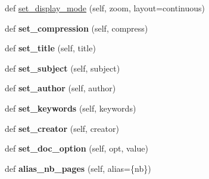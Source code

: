\begin{DoxyCompactItemize}
\item 
def \hyperlink{class_libraries_1_1fpdf_1_1fpdf_1_1_f_p_d_f_a6a28b6f7636dc3bf64cb78f5e032f4c6}{set\+\_\+display\+\_\+mode} (self, zoom, layout=\textquotesingle{}continuous\textquotesingle{})
\item 
def {\bfseries set\+\_\+compression} (self, compress)\hypertarget{class_libraries_1_1fpdf_1_1fpdf_1_1_f_p_d_f_a8b8743b3195953fdb30a1b2a78bf9d9d}{}\label{class_libraries_1_1fpdf_1_1fpdf_1_1_f_p_d_f_a8b8743b3195953fdb30a1b2a78bf9d9d}

\item 
def {\bfseries set\+\_\+title} (self, title)\hypertarget{class_libraries_1_1fpdf_1_1fpdf_1_1_f_p_d_f_a9fb912c18c41e738e54cd7962b4cd8e9}{}\label{class_libraries_1_1fpdf_1_1fpdf_1_1_f_p_d_f_a9fb912c18c41e738e54cd7962b4cd8e9}

\item 
def {\bfseries set\+\_\+subject} (self, subject)\hypertarget{class_libraries_1_1fpdf_1_1fpdf_1_1_f_p_d_f_a9e98d283a691b5161ad69f333355d0f0}{}\label{class_libraries_1_1fpdf_1_1fpdf_1_1_f_p_d_f_a9e98d283a691b5161ad69f333355d0f0}

\item 
def {\bfseries set\+\_\+author} (self, author)\hypertarget{class_libraries_1_1fpdf_1_1fpdf_1_1_f_p_d_f_a90d6024a650ba7f28632fc099017c716}{}\label{class_libraries_1_1fpdf_1_1fpdf_1_1_f_p_d_f_a90d6024a650ba7f28632fc099017c716}

\item 
def {\bfseries set\+\_\+keywords} (self, keywords)\hypertarget{class_libraries_1_1fpdf_1_1fpdf_1_1_f_p_d_f_a86f3637f3eeb6205fd8e2637e4c6239a}{}\label{class_libraries_1_1fpdf_1_1fpdf_1_1_f_p_d_f_a86f3637f3eeb6205fd8e2637e4c6239a}

\item 
def {\bfseries set\+\_\+creator} (self, creator)\hypertarget{class_libraries_1_1fpdf_1_1fpdf_1_1_f_p_d_f_a50ecfc0f7034144251da4db485916589}{}\label{class_libraries_1_1fpdf_1_1fpdf_1_1_f_p_d_f_a50ecfc0f7034144251da4db485916589}

\item 
def {\bfseries set\+\_\+doc\+\_\+option} (self, opt, value)\hypertarget{class_libraries_1_1fpdf_1_1fpdf_1_1_f_p_d_f_afd4ca8b859a073ec277a341c4a746e7c}{}\label{class_libraries_1_1fpdf_1_1fpdf_1_1_f_p_d_f_afd4ca8b859a073ec277a341c4a746e7c}

\item 
def {\bfseries alias\+\_\+nb\+\_\+pages} (self, alias=\textquotesingle{}\{nb\}\textquotesingle{})\hypertarget{class_libraries_1_1fpdf_1_1fpdf_1_1_f_p_d_f_a0671b109802cf1f27f995014dabfe5df}{}\label{class_libraries_1_1fpdf_1_1fpdf_1_1_f_p_d_f_a0671b109802cf1f27f995014dabfe5df}


\end{DoxyCompactItemize}
